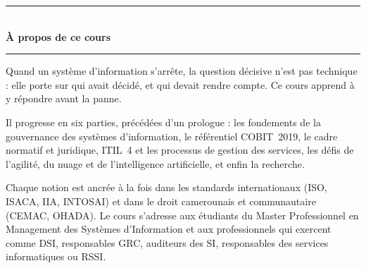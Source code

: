 \documentclass[12pt, twoside, openright, a4paper]{book}
\begin{document}
    
    
    
    
    
    

\backmatter

    \nocite{*}
    \printbibliography[heading=bibintoc, title={Références bibliographiques}]

    \printindex

\clearpage
\thispagestyle{empty}
\pagecolor{CouleurPrimaire}


\vspace*{2.5cm}

\begin{center}
    {\color{CouleurAccent}\rule{0.6\linewidth}{1pt}}\\[1.5ex]
    {\color{white}\Large\bfseries À propos de ce cours}\\[1.5ex]
    {\color{CouleurAccent}\rule{0.6\linewidth}{1pt}}
\end{center}

\vspace{1cm}

\begin{center}
\begin{minipage}{0.75\textwidth}
\color{white!85!gray}
Quand un système d'information s'arrête, la question décisive n'est pas
technique : elle porte sur qui avait décidé, et qui devait rendre compte.
Ce cours apprend à y répondre avant la panne.

\medskip

Il progresse en six parties, précédées d'un prologue : les fondements de la
gouvernance des systèmes d'information, le référentiel COBIT~2019, le cadre
normatif et juridique, ITIL~4 et les processus de gestion des services, les
défis de l'agilité, du nuage et de l'intelligence artificielle, et enfin la
recherche.

\medskip

Chaque notion est ancrée à la fois dans les standards internationaux (ISO,
ISACA, IIA, INTOSAI) et dans le droit camerounais et communautaire (CEMAC,
OHADA). Le cours s'adresse aux étudiants du Master Professionnel en
Management des Systèmes d'Information et aux professionnels qui exercent comme
DSI, responsables GRC, auditeurs des SI, responsables des services
informatiques ou RSSI.
\end{minipage}
\end{center}
\end{document}

